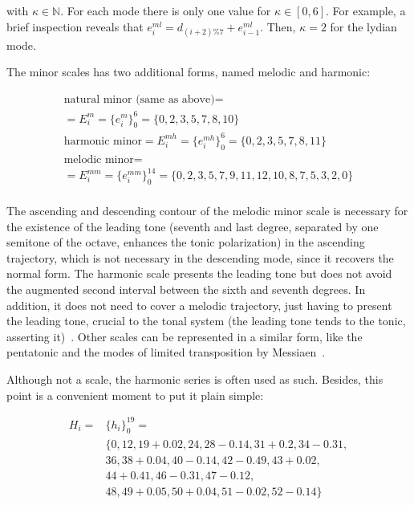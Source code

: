 \documentclass[
 aip,
 jmp,
 amsmath,amssymb,
 reprint,
]{revtex4-1}
\begin{document}
\noindent with $\kappa \in \mathbb{N}$. For each mode there is only one value
for $\kappa \in [0,6]$. For example, a brief inspection reveals that
$e_i^{ml}=d_{(i+2)\%7}+e_{i-1}^{ml}$. Then, $\kappa=2$ for the lydian mode.

The minor scales has two additional forms, named melodic and harmonic:

\begin{multline}\label{eq:escalasMenores}
\text{natural minor (same as above)}  = \\ = E_i^m = \{e_i^m\}_0^6 = \{0,2,3,5,7,8,10\} \\
\text{harmonic minor}  = E_i^{mh} = \{e_i^{mh}\}_0^6 = \{0,2,3,5,7,8,11\} \\
\text{melodic minor}  = \\ = E_i^{mm} = \{e_i^{mm}\}_0^{14} = \{0,2,3,5,7,9,11,12,10,8,7,5,3,2,0\} \\
\end{multline}

The ascending and descending contour of the melodic minor scale is necessary for the existence of the leading tone (seventh and last degree, separated by one semitone of the octave, enhances the tonic polarization) in the ascending trajectory, which is not necessary in the descending mode, since it recovers the normal form. The harmonic scale presents the leading tone but does not avoid the augmented second interval between the sixth and seventh degrees. In addition, it does not need to cover a melodic trajectory, just having to present the leading tone, crucial to the tonal system (the leading tone tends to the tonic, asserting it)~\cite{Harmonia}. 
Other scales can be represented in a similar form, like the pentatonic and the
modes of limited transposition by Messiaen~\cite{Messiaen}. 

Although not a scale, the harmonic series is often used as such. Besides, this point is a convenient moment to put it plain simple:

\begin{equation}\label{eq:serieHarmonica}
\begin{split}
H_i = & \{h_i\}_0^{19}= \\
      & \{ 0,12,19+0.02,  24,28-0.14, 31+0.2, 34-0.31, \\
                     & 36, 38+0.04,40-0.14, 42-0.49, 43+0.02, \\
                     & 44+0.41, 46-0.31, 47-0.12, \\
                     & 48, 49+0.05, 50+0.04, 51-0.02, 52-0.14   \}
\end{split}
\end{equation}
\end{document}
